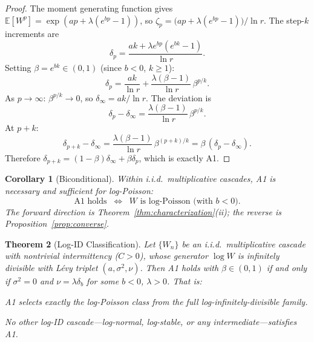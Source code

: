 \documentclass[12pt]{amsart}
\newtheorem{theorem}{Theorem}
\newtheorem{corollary}[theorem]{Corollary}
\theoremstyle{definition}
\theoremstyle{remark}
\begin{document}
\begin{proof}
The moment generating function gives $\mathbb{E}[W^p] = \exp(ap +
\lambda(e^{bp} - 1))$, so $\zeta_p = \bigl(ap + \lambda(e^{bp} -
1)\bigr)/\ln r$.  The step-$k$ increments are
\[
  \delta_p = \frac{ak + \lambda e^{bp}(e^{bk}-1)}{\ln r}.
\]
Setting $\beta = e^{bk} \in (0,1)$ (since $b < 0$, $k \geq 1$):
\[
  \delta_p = \frac{ak}{\ln r}
  + \frac{\lambda(\beta - 1)}{\ln r}\,\beta^{p/k}.
\]
As $p \to \infty$: $\beta^{p/k} \to 0$, so $\delta_\infty = ak/\ln
r$.  The deviation is
\[
  \delta_p - \delta_\infty
  = \frac{\lambda(\beta - 1)}{\ln r}\,\beta^{p/k}.
\]
At $p + k$:
\[
  \delta_{p+k} - \delta_\infty
  = \frac{\lambda(\beta-1)}{\ln r}\,\beta^{(p+k)/k}
  = \beta\,(\delta_p - \delta_\infty).
\]
Therefore $\delta_{p+k} = (1-\beta)\delta_\infty + \beta\delta_p$,
which is exactly A1.
\end{proof}

\begin{corollary}[Biconditional]\label{cor:biconditional}
Within i.i.d.\ multiplicative cascades, A1 is necessary and
sufficient for log-Poisson:
\[
  \text{A1 holds}
  \;\;\Longleftrightarrow\;\;
  W \text{ is log-Poisson (with } b < 0\text{).}
\]
The forward direction is
Theorem~\textup{\ref{thm:characterization}(ii)}; the reverse is
Proposition~\textup{\ref{prop:converse}}.
\end{corollary}


\begin{theorem}[Log-ID Classification]\label{thm:classification}
Let $\{W_n\}$ be an i.i.d.\ multiplicative cascade with nontrivial
intermittency ($C > 0$), whose generator $\log W$ is infinitely
divisible with L\'evy triplet $(a, \sigma^2, \nu)$.  Then A1 holds
with $\beta \in (0,1)$ if and only if $\sigma^2 = 0$ and $\nu =
\lambda\delta_b$ for some $b < 0$, $\lambda > 0$.  That is:
\begin{center}
\emph{A1 selects exactly the log-Poisson class from the full
log-infinitely-divisible family.}
\end{center}
No other log-ID cascade---log-normal, log-stable, or any
intermediate---satisfies A1.
\end{theorem}
\end{document}
